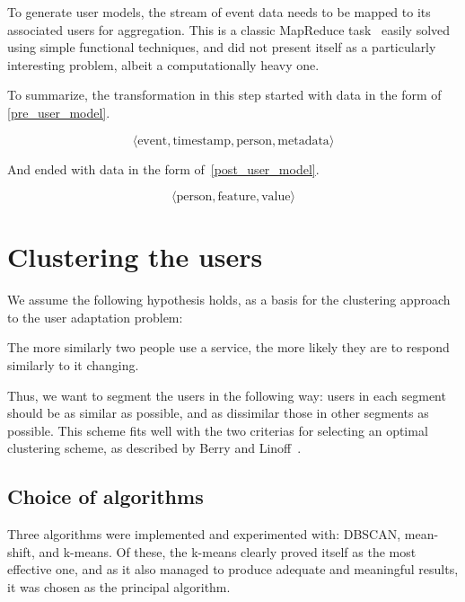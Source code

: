 To generate user models, the stream of event data needs to be mapped to its associated users for aggregation. This is a classic MapReduce task~\cite{Dean2008} easily solved using simple functional techniques, and did not present itself as a particularly interesting problem, albeit a computationally heavy one.

To summarize, the transformation in this step started with data in the form of \eqref{pre_user_model}.

\begin{equation}
  \langle \text{event}, \text{timestamp}, \text{person}, \text{metadata} \rangle
  \label{pre_user_model}
\end{equation}

And ended with data in the form of~\eqref{post_user_model}.

\begin{equation}
  \langle \text{person}, \text{feature}, \text{value} \rangle
  \label{post_user_model}
\end{equation}

\section{Clustering the users}
\label{sec:clustering}

We assume the following hypothesis holds, as a basis for the clustering approach to the user adaptation problem:

\begin{hypothesis}
The more similarly two people use a service, the more likely they are to respond similarly to it changing.
\end{hypothesis}

Thus, we want to segment the users in the following way: users in each segment should be as similar as possible, and as dissimilar those in other segments as possible. This scheme fits well with the two criterias for selecting an optimal clustering scheme, as described by Berry and Linoff~\cite{Berry1997}.

\subsection{Choice of algorithms}
\label{sub:clustering_algorithms}

Three algorithms were implemented and experimented with: DBSCAN, mean-shift, and k-means. Of these, the k-means clearly proved itself as the most effective one, and as it also managed to produce adequate and meaningful results, it was chosen as the principal algorithm.

